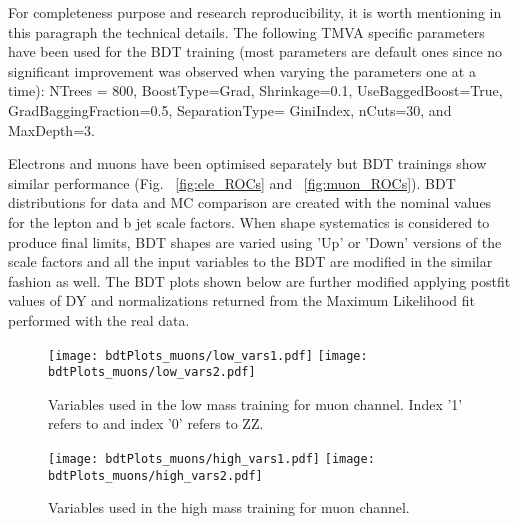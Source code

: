 For completeness purpose and research reproducibility, it is worth mentioning in this paragraph the technical details. The following TMVA specific parameters have been used for the BDT training (most parameters are default ones since no significant improvement was observed when varying the parameters one at a time): NTrees = 800, BoostType=Grad, Shrinkage=0.1, UseBaggedBoost=True, GradBaggingFraction=0.5, SeparationType= GiniIndex, nCuts=30, and MaxDepth=3. %


Electrons and muons have been optimised separately but BDT trainings show similar performance (Fig. ~\ref{fig:ele_ROCs} and ~\ref{fig:muon_ROCs}). BDT distributions for data and MC comparison are created with the nominal values for the lepton and b jet scale factors. When shape systematics is considered to produce final limits, BDT shapes are
varied using 'Up' or 'Down' versions of the scale factors and all the input variables to the BDT are modified in the similar fashion as well. The BDT plots shown below are further modified applying postfit values of DY and \ttbar normalizations returned from the Maximum Likelihood fit performed with the real data. 






\begin{figure}[tbp]
  \begin{center}
   \texttt{[image: bdtPlots\_muons/low\_vars1.pdf]}
   \texttt{[image: bdtPlots\_muons/low\_vars2.pdf]}
    \caption{Variables used in the low mass training for muon channel. Index '1' refers to \bbbar and index '0' refers to ZZ.}
    \label{fig:muon_lowVars}
  \end{center}
\end{figure}



\begin{figure}[tbp]
  \begin{center}
   \texttt{[image: bdtPlots\_muons/high\_vars1.pdf]}
   \texttt{[image: bdtPlots\_muons/high\_vars2.pdf]}
    \caption{ Variables used in the high mass training for muon channel.}
    \label{fig:muon_highVars}
  \end{center}
\end{figure}


